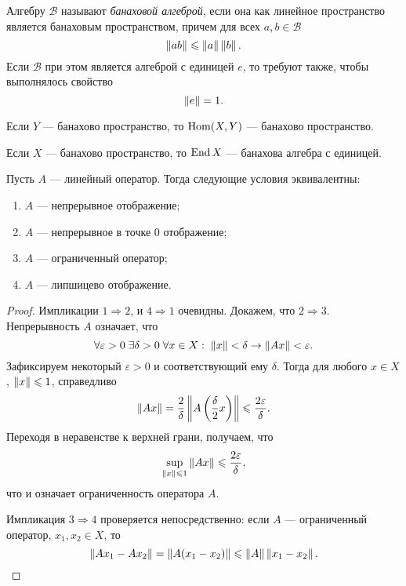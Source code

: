 \begin{definition}
    Алгебру $\mathcal B$ называют \emph{банаховой алгеброй}, если она как линейное пространство является банаховым пространством, причем для всех $a, b \in \mathcal B$ 
    \[ \left\|ab\right\| \leqslant \left\|a\right\|\left\|b\right\|. \]
    Если $\mathcal B$ при этом является алгеброй с единицей $e$, то требуют также, чтобы выполнялось свойство
    \[ \left\|e\right\| = 1. \]
\end{definition}

\begin{theorem}
    Если $Y$ --- банахово пространство, то $\operatorname{Hom}(X, Y)$ --- банахово
    пространство.
\end{theorem}

\begin{corollary}
    Если $X$ --- банахово пространство, то $\operatorname{End} X$ --- банахова алгебра с единицей.
\end{corollary}

\begin{theorem}
    Пусть $A$ --- линейный оператор. Тогда следующие условия эквивалентны:
    \begin{enumerate}
        \item $A$ --- непрерывное отображение;
        \item $A$ --- непрерывное в точке $0$ отображение;
        \item $A$ --- ограниченный оператор;
        \item $A$ --- липшицево отображение.
    \end{enumerate}
\end{theorem}

\begin{proof}
    Импликации $1 \Rightarrow 2$, и $4 \Rightarrow 1$ очевидны.
    Докажем, что $2 \Rightarrow 3$.
    Непрерывность $A$ означает, что
    \[ \forall \varepsilon > 0 \; \exists \delta > 0 \; \forall x \in X: \; \left\|x\right\| <
    \delta \rightarrow \left\|Ax\right\| < \varepsilon. \]
    Зафиксируем некоторый $\varepsilon > 0$ и соответствующий ему $\delta$.
    Тогда для любого $x \in X$, $\left\|x\right\| \leqslant
    1$, справедливо
    \[ \left\|Ax\right\| = \frac{2}{\delta} \left\|A\left( \frac{\delta}{2} x \right)\right\|
    \leqslant \frac{2\varepsilon}{\delta}. \]
    Переходя в неравенстве к верхней грани, получаем, что
    \[ \sup_{\left\|x\right\| \leqslant 1}\left\|Ax\right\| \leqslant \frac{2\varepsilon}{\delta}, \]
    что и означает ограниченность оператора $A$.

    Импликация $3 \Rightarrow 4$ проверяется непосредственно: если $A$ ---
    ограниченный оператор, $x_1, x_2 \in X$, то
    \[ \left\|Ax_1 - Ax_2\right\| = \left\|A(x_1 - x_2)\right\| \leqslant \left\|A\right\| \left\|x_1 - x_2\right\|.
    \]
\end{proof}

